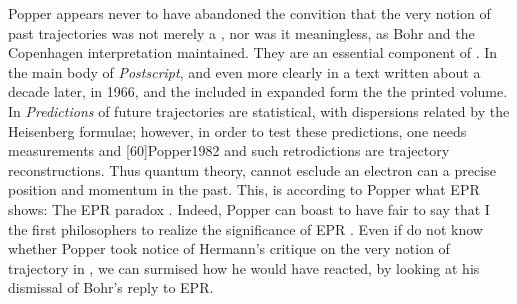 \documentclass[final,12pt]{article}
\begin{document}
Popper appears never to have abandoned the convition that the very notion of past trajectories was not merely a , nor was it meaningless, as Bohr and the Copenhagen interpretation maintained. They are an essential component of \qm. In the main body of \emph{Postscript}, and even more clearly in a text written about a decade later, in 1966, \citet{Popper1967} and the included in expanded form the the printed volume. In \qm \emph{Predictions} of future trajectories are statistical, with dispersions related by the Heisenberg formulae; however, in order to test these predictions, one needs measurements and   [60]{Popper1982} and such retrodictions are trajectory reconstructions. Thus quantum theory, cannot esclude an electron can  a precise position and momentum in the past. This, is according to Popper what EPR shows: The EPR paradox  \citep[63]{Popper1982}. Indeed, Popper can boast to have  fair to say that I the first philosophers to realize the significance of EPR \citep[14]{Popper1982}. Even if do not know whether Popper took notice of Hermann's critique on the very notion of trajectory in \qm, we can surmised how he would have reacted, by looking at his dismissal of Bohr's reply to EPR.

\end{document}
